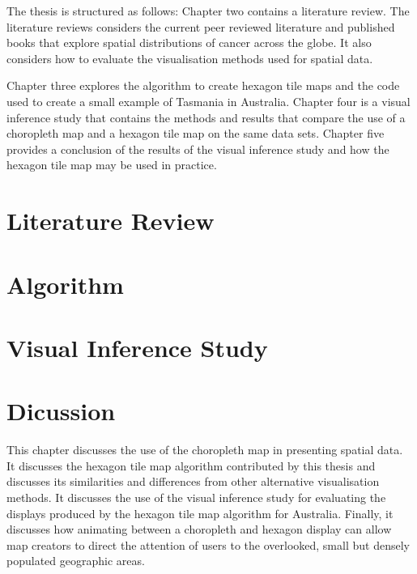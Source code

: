 \documentclass{monashthesis}
\begin{document}
The thesis is structured as follows: Chapter two contains a literature review.
The literature reviews considers the current peer reviewed literature and published books that explore spatial distributions of cancer across the globe.
It also considers how to evaluate the visualisation methods used for spatial data.

Chapter three explores the algorithm to create hexagon tile maps and the code used to create a small example of Tasmania in Australia.
Chapter four is a visual inference study that contains the methods and results that compare the use of a choropleth map and a hexagon tile map on the same data sets.
Chapter five provides a conclusion of the results of the visual inference study and how the hexagon tile map may be used in practice.

\hypertarget{ch:literature}{%
\chapter{Literature Review}\label{ch:literature}}





\hypertarget{ch:algorithm}{%
\chapter{Algorithm}\label{ch:algorithm}}





\hypertarget{ch:experiment}{%
\chapter{Visual Inference Study}\label{ch:experiment}}





\hypertarget{ch:discussion}{%
\chapter{Dicussion}\label{ch:discussion}}

This chapter discusses the use of the choropleth map in presenting spatial data.
It discusses the hexagon tile map algorithm contributed by this thesis and discusses its similarities and differences from other alternative visualisation methods.
It discusses the use of the visual inference study for evaluating the displays produced by the hexagon tile map algorithm for Australia. Finally, it discusses how animating between a choropleth and hexagon display can allow map creators to direct the attention of users to the overlooked, small but densely populated geographic areas.
\end{document}
